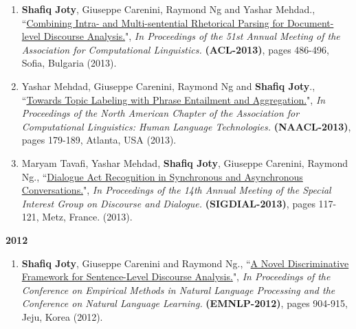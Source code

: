 \documentclass[paper=letter,fontsize=11pt]{scrartcl} %
\newcommand{\PaperEntry}[7]{
		\noindent #1, ``\href{#7}{#2}", \textit{#3} \textbf{#4}, #5 (#6).}
\begin{document}
\begin{enumerate}

\item \PaperEntry{\textbf{Shafiq Joty}, Giuseppe Carenini, Raymond Ng and Yashar Mehdad.}{Combining Intra- and Multi-sentential Rhetorical Parsing for Document-level Discourse Analysis.}{In Proceedings of the 51st Annual Meeting of the Association for Computational Linguistics.} {(ACL-2013)}{pages 486-496, Sofia, Bulgaria}{2013}
{http://www.aclweb.org/anthology/P13-1048}

\item \PaperEntry{Yashar Mehdad, Giuseppe Carenini, Raymond Ng and \textbf{Shafiq Joty}.}{Towards Topic Labeling with Phrase Entailment and Aggregation.}{In Proceedings of the North American Chapter of the Association for Computational Linguistics: Human Language Technologies.} {(NAACL-2013)}{pages 179-189, Atlanta, USA}{2013}
{http://www.aclweb.org/anthology/N13-1018}

\item \PaperEntry{Maryam Tavafi, Yashar Mehdad, \textbf{Shafiq Joty}, Giuseppe Carenini, Raymond Ng.}{Dialogue Act Recognition in Synchronous and Asynchronous Conversations.}{In Proceedings of the 14th Annual Meeting of the Special Interest Group on Discourse and Dialogue.} {(SIGDIAL-2013)}{pages 117-121, Metz, France.}{2013}
{http://www.aclweb.org/anthology/W13-4017}

\end{enumerate}

\Large \textbf{2012} \normalsize
\begin{enumerate}
\item \PaperEntry{\textbf{Shafiq Joty}, Giuseppe Carenini and Raymond Ng.}{A Novel Discriminative Framework for Sentence-Level Discourse Analysis.}{In Proceedings of the Conference on Empirical Methods in Natural Language Processing and the Conference on Natural Language Learning.} {(EMNLP-2012)}{pages 904-915, Jeju, Korea}{2012}
{https://aclweb.org/anthology/D/D12/D12-1083.pdf}
\end{enumerate}
\end{document}
